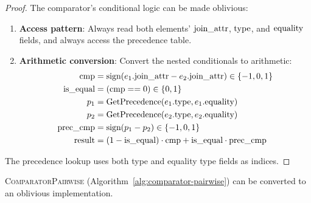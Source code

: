 \begin{proof}
The comparator's conditional logic can be made oblivious:
\begin{enumerate}
\item \textbf{Access pattern}: Always read both elements' $\text{join\_attr}$, $\text{type}$, and $\text{equality}$ fields, and always access the precedence table.
\item \textbf{Arithmetic conversion}: Convert the nested conditionals to arithmetic:
\begin{align}
\text{cmp} &= \text{sign}(e_1.\text{join\_attr} - e_2.\text{join\_attr}) \in \{-1, 0, 1\} \nonumber \\
\text{is\_equal} &= (\text{cmp} == 0) \in \{0,1\} \nonumber \\
p_1 &= \text{GetPrecedence}(e_1.\text{type}, e_1.\text{equality}) \nonumber \\
p_2 &= \text{GetPrecedence}(e_2.\text{type}, e_2.\text{equality}) \nonumber \\
\text{prec\_cmp} &= \text{sign}(p_1 - p_2) \in \{-1, 0, 1\} \nonumber \\
\text{result} &= (1 - \text{is\_equal}) \cdot \text{cmp} + \text{is\_equal} \cdot \text{prec\_cmp} \nonumber
\end{align}
\end{enumerate}
The precedence lookup uses both type and equality type fields as indices.
\end{proof}

\begin{lemma}
\label{lem:comparator-pairwise}
\textsc{ComparatorPairwise} (Algorithm~\ref{alg:comparator-pairwise}) can be converted to an oblivious implementation.
\end{lemma}

